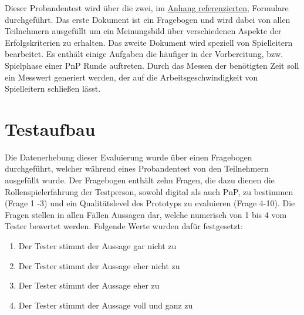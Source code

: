 Dieser Probandentest wird über die zwei, im \hyperlink{AppendixFragebogenA.1}{Anhang referenzierten}, Formulare durchgeführt. Das erste Dokument ist ein Fragebogen und wird dabei von allen Teilnehmern ausgefüllt um ein Meinungsbild über verschiedenen Aspekte der Erfolgskriterien zu erhalten. Das zweite Dokument wird speziell von Spielleitern bearbeitet. Es enthält einige Aufgaben die häufiger in der Vorbereitung, bzw. Spielphase einer PnP Runde auftreten. Durch das Messen der benötigten Zeit soll ein Messwert generiert werden, der auf die Arbeitsgeschwindigkeit von Spielleitern schließen lässt.
  



\section{Testaufbau}
\label{sec:Testaufbau}
Die Datenerhebung dieser Evaluierung wurde über einen Fragebogen durchgeführt, welcher während eines Probandentest von den Teilnehmern ausgefüllt wurde. Der Fragebogen enthält zehn Fragen, die dazu dienen die Rollenspielerfahrung der Testperson, sowohl digital als auch PnP, zu bestimmen (Frage 1 -3) und ein Qualitätslevel des Prototyps zu evaluieren (Frage 4-10). Die Fragen stellen in allen Fällen Aussagen dar, welche numerisch von 1 bis 4 vom Tester bewertet werden. Folgende Werte wurden dafür festgesetzt:

\begin{enumerate}
	\item Der Tester stimmt der Aussage gar nicht zu
	\item Der Tester stimmt der Aussage eher nicht zu
	\item Der Tester stimmt der Aussage eher zu
	\item Der Tester stimmt der Aussage voll und ganz zu
\end{enumerate}

